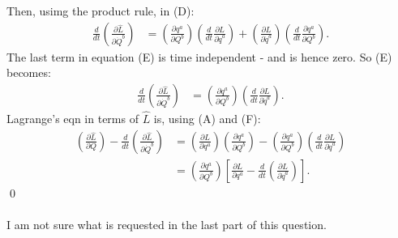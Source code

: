 \documentclass[12pt]{article}
\begin{document}
Then, usimg the product rule, in (D):
\begin{align*}
\frac{d}{dt}
\left(\frac{\partial\hat L}{\partial\dot Q^b}\right)
&=
\left(\frac{\partial q^a}{\partial Q^b}\right)
\left(\frac{d}{dt}\frac{\partial L}{\partial\dot q^a}\right)
+
\left(\frac{\partial L}{\partial\dot q^a}\right)
\left(\frac{d}{dt}\frac{\partial q^a}{\partial Q^b}\right).
\tag{E}
\end{align*}
The last term in equation (E) is time independent - and
is hence zero. So (E) becomes:
\begin{align*}
\frac{d}{dt}
\left(\frac{\partial\hat L}{\partial\dot Q^b}\right)
&=
\left(\frac{\partial q^a}{\partial Q^b}\right)
\left(\frac{d}{dt}\frac{\partial L}{\partial\dot q^a}\right).
\tag{F}
\end{align*}
Lagrange's eqn in terms of $\hat L$ is, using (A) and (F):
\begin{align*}
\left(\frac{\partial\hat L}{\partial Q}\right)
-
\frac{d}{dt}
\left(\frac{\partial\hat L}{\partial\dot Q^b}\right)
&=
\left(\frac{\partial L}{\partial q^a}\right)
\left(\frac{\partial q^a}{\partial Q^b}\right)
-
\left(\frac{\partial q^a}{\partial Q^b}\right)
\left(\frac{d}{dt}\frac{\partial L}{\partial\dot q^a}\right)\\
&=
\left(\frac{\partial q^a}{\partial Q^b}\right)
\left[
\frac{\partial L}{\partial q^a}
-
\frac{d}{dt}
\left(\frac{\partial L}{\partial\dot q^a}\right)
\right].
\end{align*}
\qed\\
\\
I am not sure what is requested in the last part of this question.

\newpage
\noindent
\end{document}
